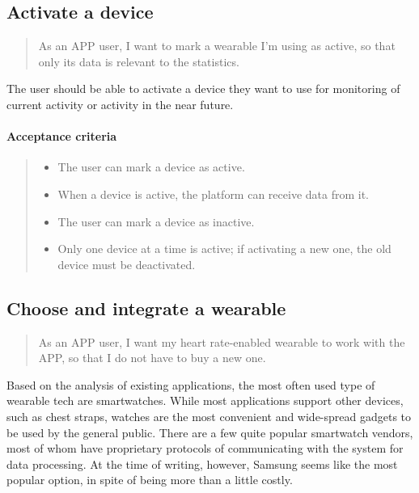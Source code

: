 \subsection{Activate a device}\label{US:HRM-device-activate}

\begin{quote}
As an APP user, I want to mark a wearable I'm using as active, so that only its data is relevant to the statistics.
\end{quote}

The user should be able to activate a device they want to use for monitoring of current activity or activity in the near future.

\paragraph*{Acceptance criteria}
\begin{quote}
\begin{itemize}
    \item The user can mark a device as active.
    \item When a device is active, the platform can receive data from it.
    \item The user can mark a device as inactive.
    \item Only one device at a time is active; if activating a new one, the old device must be deactivated.
\end{itemize}    
\end{quote}

\subsection{Choose and integrate a wearable}\label{US:HRM-device-integrate}
\begin{quote}
As an APP user, I want my heart rate-enabled wearable to work with the APP, so that I do not have to buy a new one.
\end{quote}

Based on the analysis of existing applications, the most often used type of wearable tech are smartwatches.
While most applications support other devices, such as chest straps, watches are the most convenient and wide-spread gadgets to be used by the general public.
There are a few quite popular smartwatch vendors, most of whom have proprietary protocols of communicating with the system for data processing.
At the time of writing, however, Samsung seems like the most popular option, in spite of being more than a little costly.


